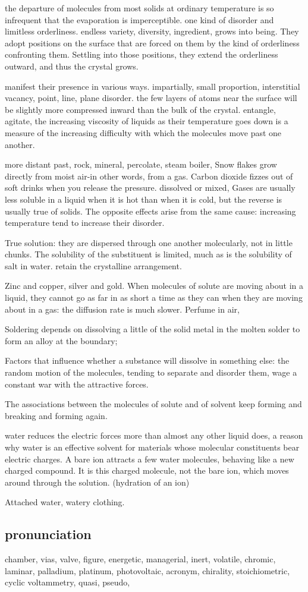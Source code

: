 the departure of molecules from most solids at ordinary temperature is so infrequent that the evaporation is imperceptible. 
one kind of disorder and limitless orderliness. endless variety, diversity, ingredient, grows into being. They adopt positions on the surface that are forced on them by the kind of orderliness confronting them. Settling into those positions, they extend the orderliness outward, and thus the crystal grows. 

manifest their presence in various ways. impartially, small proportion, interstitial vacancy, point, line, plane disorder. the few layers of atoms near the surface will be slightly more compressed  inward than the bulk of the crystal. entangle, agitate, the increasing viscosity of liquids as their temperature goes down is a measure of the increasing difficulty with which the molecules move past one another. 

more distant past, rock, mineral, percolate, steam boiler, 
Snow flakes grow directly from moist air-in other words, from a gas. Carbon dioxide fizzes out of soft drinks when you release the pressure. dissolved or mixed, 
Gases are usually less soluble in a liquid when it is hot than when it is cold, but the reverse is usually true of solids. The opposite effects arise from the same cause: increasing temperature tend to increase their disorder. 

True solution: they are dispersed through one another molecularly, not in little chunks. 
The solubility of the substituent is limited, much as is the solubility of salt in water. retain the crystalline arrangement. 

Zinc and copper, silver and gold. 
When molecules of solute are moving about in a liquid, they cannot go as far in as short a time as they can when they are moving about in a gas: the diffusion rate is much slower. Perfume in air, 

Soldering depends on dissolving a little of the solid metal in the molten solder to form an alloy at the boundary; 

Factors that influence whether a substance will dissolve in something else: the random motion of the molecules, tending to separate and disorder them, wage a constant war with the attractive forces.  

The associations between the molecules of solute and of solvent keep forming and breaking and forming again. 

water reduces the electric forces more than almost any other liquid does, a reason why water is an effective solvent for materials whose molecular constituents bear electric charges.  A bare ion attracts a few water molecules, behaving like a new charged compound. It is this charged molecule, not the bare ion, which moves around through the solution. (hydration of an ion) 

Attached water, watery clothing. 




\subsection{pronunciation}

chamber, vias, valve, figure, energetic, managerial, inert, volatile, chromic,
laminar, palladium, platinum, photovoltaic, acronym, chirality, stoichiometric, cyclic voltammetry, quasi, pseudo, 

